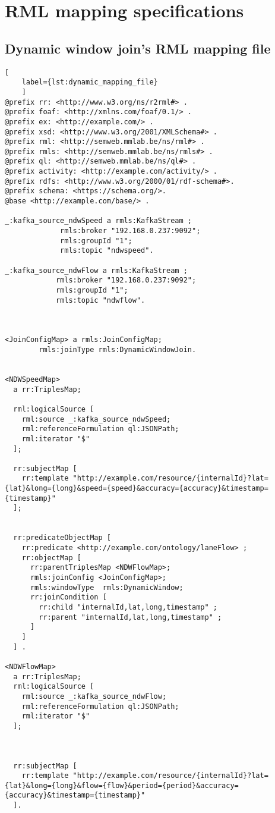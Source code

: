 \chapter{RML mapping specifications}

\section{Dynamic window join's RML mapping file}
\begin{lstlisting}[
    label={lst:dynamic_mapping_file}
    ]
@prefix rr: <http://www.w3.org/ns/r2rml#> .
@prefix foaf: <http://xmlns.com/foaf/0.1/> .
@prefix ex: <http://example.com/> .
@prefix xsd: <http://www.w3.org/2001/XMLSchema#> .
@prefix rml: <http://semweb.mmlab.be/ns/rml#> .
@prefix rmls: <http://semweb.mmlab.be/ns/rmls#> .
@prefix ql: <http://semweb.mmlab.be/ns/ql#> .
@prefix activity: <http://example.com/activity/> .
@prefix rdfs: <http://www.w3.org/2000/01/rdf-schema#>.
@prefix schema: <https://schema.org/>. 
@base <http://example.com/base/> .

_:kafka_source_ndwSpeed a rmls:KafkaStream ;
             rmls:broker "192.168.0.237:9092";
             rmls:groupId "1";
             rmls:topic "ndwspeed".

_:kafka_source_ndwFlow a rmls:KafkaStream ; 
            rmls:broker "192.168.0.237:9092"; 
            rmls:groupId "1"; 
            rmls:topic "ndwflow". 



<JoinConfigMap> a rmls:JoinConfigMap;
        rmls:joinType rmls:DynamicWindowJoin.


<NDWSpeedMap>
  a rr:TriplesMap;

  rml:logicalSource [
    rml:source _:kafka_source_ndwSpeed;
    rml:referenceFormulation ql:JSONPath; 
    rml:iterator "$"
  ];

  rr:subjectMap [
    rr:template "http://example.com/resource/{internalId}?lat={lat}&long={long}&speed={speed}&accuracy={accuracy}&timestamp={timestamp}"
  ];

  
  rr:predicateObjectMap [
    rr:predicate <http://example.com/ontology/laneFlow> ;
    rr:objectMap [
      rr:parentTriplesMap <NDWFlowMap>;
      rmls:joinConfig <JoinConfigMap>;
      rmls:windowType  rmls:DynamicWindow;
      rr:joinCondition [
        rr:child "internalId,lat,long,timestamp" ;
        rr:parent "internalId,lat,long,timestamp" ;
      ]
    ]
  ] .

<NDWFlowMap>
  a rr:TriplesMap;
  rml:logicalSource [
    rml:source _:kafka_source_ndwFlow;
    rml:referenceFormulation ql:JSONPath;
    rml:iterator "$"
  ];



  rr:subjectMap [
    rr:template "http://example.com/resource/{internalId}?lat={lat}&long={long}&flow={flow}&period={period}&accuracy={accuracy}&timestamp={timestamp}"
  ]. 
\end{lstlisting}

